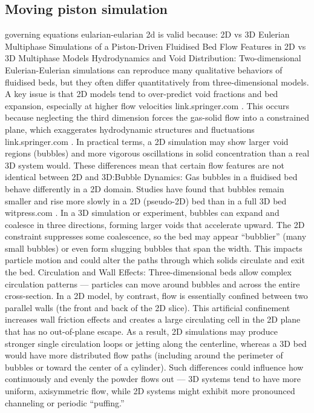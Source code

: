 \subsection{Moving piston simulation}
governing equations eularian-eularian
2d is valid because:
2D vs 3D Eulerian Multiphase Simulations of a Piston-Driven Fluidised Bed
Flow Features in 2D vs 3D Multiphase Models
Hydrodynamics and Void Distribution: Two-dimensional Eulerian-Eulerian simulations can reproduce many qualitative behaviors of fluidised beds, but they often differ quantitatively from three-dimensional models. A key issue is that 2D models tend to over-predict void fractions and bed expansion, especially at higher flow velocities
link.springer.com
. This occurs because neglecting the third dimension forces the gas-solid flow into a constrained plane, which exaggerates hydrodynamic structures and fluctuations
link.springer.com
. In practical terms, a 2D simulation may show larger void regions (bubbles) and more vigorous oscillations in solid concentration than a real 3D system would. These differences mean that certain flow features are not identical between 2D and 3D:Bubble Dynamics: Gas bubbles in a fluidised bed behave differently in a 2D domain. Studies have found that bubbles remain smaller and rise more slowly in a 2D (pseudo-2D) bed than in a full 3D bed
witpress.com
. In a 3D simulation or experiment, bubbles can expand and coalesce in three directions, forming larger voids that accelerate upward. The 2D constraint suppresses some coalescence, so the bed may appear “bubblier” (many small bubbles) or even form slugging bubbles that span the width. This impacts particle motion and could alter the paths through which solids circulate and exit the bed.
Circulation and Wall Effects: Three-dimensional beds allow complex circulation patterns — particles can move around bubbles and across the entire cross-section. In a 2D model, by contrast, flow is essentially confined between two parallel walls (the front and back of the 2D slice). This artificial confinement increases wall friction effects and creates a large circulating cell in the 2D plane that has no out-of-plane escape. As a result, 2D simulations may produce stronger single circulation loops or jetting along the centerline, whereas a 3D bed would have more distributed flow paths (including around the perimeter of bubbles or toward the center of a cylinder). Such differences could influence how continuously and evenly the powder flows out — 3D systems tend to have more uniform, axisymmetric flow, while 2D systems might exhibit more pronounced channeling or periodic “puffing.”
